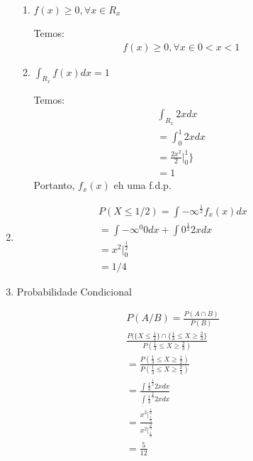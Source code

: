 \begin{description}
\begin{enumerate}[label=(\alph*)]
\begin{enumerate}[leftmargin=*, label=\roman*., widest=IV, align=left]
             \item $f(x)\geq 0, \forall x \in R_{x}$

               Temos:
\begin{align*}                 f(x)\geq 0, \forall x \in  0<x<1\end{align*}

             \item $\int_{R_{x}} f(x)dx=1$

               Temos:
                   \begin{align*}
                     \int_{R_x} 2x dx\\
                     =\int_{0}^1 2x dx\\ 
                   = \frac{2x^2}{2}|^1_0 \}\\
                   = 1
                 \end{align*}
                 Portanto, $f_x(x)$ eh uma f.d.p.\
             \end{enumerate}

           \item 
             \begin{align*}
               P(X \leq 1/2) = \int{-\infty}^{\frac{1}{2}} f_x (x) dx\\
               = \int{-\infty}^0 0 dx + \int{0}^{\frac{1}{2}} 2x dx \\
               = x^2 |^{\frac{1}{2}}_0\\
               = 1/4
             \end{align*}
           \item Probabilidade Condicional
             \begin{figure}[H]
               \centering
               
               \caption{}
               \label{fig:}
             \end{figure}
             \begin{align*}
               P(A/B)= \frac{P(A\cap B)}{P(B)} \\
               \frac{ P(\{X \leq \frac{1}{2}\} \cap \{ \frac{1}{3} \leq X \geq \frac{2}{3}\}}{P ( \frac{1}{3} \leq X \geq \frac{2}{3} )}\\
               = \frac{P( \frac{1}{3} \leq X \geq \frac{1}{2} )}{P( \frac{1}{3} \leq X \geq \frac{2}{3} )}\\
               = \frac{\int{\frac{1}{3}}^{\frac{1}{2}} 2x dx}{\int{\frac{1}{3}}^{\frac{2}{3}}2x dx} \\
               = \frac{x^2 |^{\frac{1}{2}}_{\frac{1}{3}}}{x^2 |^{\frac{2}{3}}_{\frac{1}{3}}}\\
               = \frac{5}{12}
             \end{align*}
     \end{enumerate}

 \end{description}
